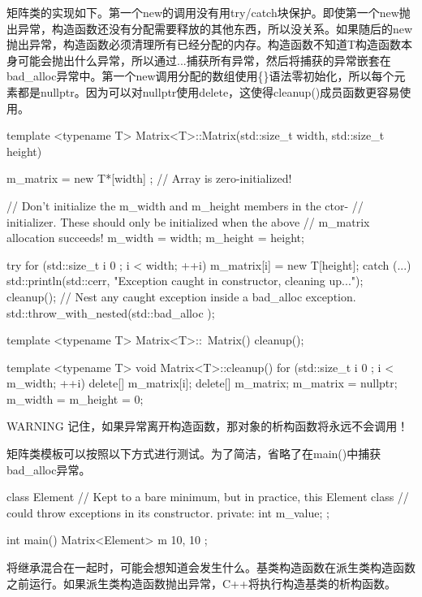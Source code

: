 矩阵类的实现如下。第一个new的调用没有用try/catch块保护。即使第一个new抛出异常，构造函数还没有分配需要释放的其他东西，所以没关系。如果随后的new抛出异常，构造函数必须清理所有已经分配的内存。构造函数不知道T构造函数本身可能会抛出什么异常，所以通过...捕获所有异常，然后将捕获的异常嵌套在bad\_alloc异常中。第一个new调用分配的数组使用\{\}语法零初始化，所以每个元素都是nullptr。因为可以对nullptr使用delete，这使得cleanup()成员函数更容易使用。

\begin{cpp}
template <typename T>
Matrix<T>::Matrix(std::size_t width, std::size_t height)
{
    m_matrix = new T*[width] {}; // Array is zero-initialized!

    // Don't initialize the m_width and m_height members in the ctor-
    // initializer. These should only be initialized when the above
    // m_matrix allocation succeeds!
    m_width = width;
    m_height = height;

    try {
        for (std::size_t i { 0 }; i < width; ++i) {
            m_matrix[i] = new T[height];
        }
    } catch (...) {
        std::println(std::cerr, "Exception caught in constructor, cleaning up...");
        cleanup();
        // Nest any caught exception inside a bad_alloc exception.
        std::throw_with_nested(std::bad_alloc {});
    }
}

template <typename T>
Matrix<T>::~Matrix()
{
    cleanup();
}

template <typename T>
void Matrix<T>::cleanup()
{
    for (std::size_t i { 0 }; i < m_width; ++i) {
        delete[] m_matrix[i];
    }
    delete[] m_matrix;
    m_matrix = nullptr;
    m_width = m_height = 0;
}
\end{cpp}

\begin{myWarning}{WARNING}
记住，如果异常离开构造函数，那对象的析构函数将永远不会调用！
\end{myWarning}

矩阵类模板可以按照以下方式进行测试。为了简洁，省略了在main()中捕获bad\_alloc异常。

\begin{cpp}
class Element
{
    // Kept to a bare minimum, but in practice, this Element class
    // could throw exceptions in its constructor.
    private:
    int m_value;
};

int main()
{
    Matrix<Element> m { 10, 10 };
}
\end{cpp}

将继承混合在一起时，可能会想知道会发生什么。基类构造函数在派生类构造函数之前运行。如果派生类构造函数抛出异常，C++将执行构造基类的析构函数。

